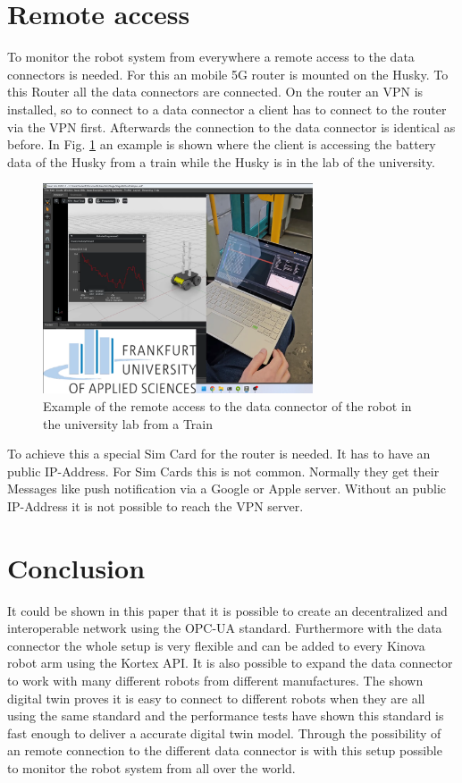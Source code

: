 \documentclass[conference]{IEEEtran}
\begin{document}
\section{Remote access}
To monitor the robot system from everywhere a remote access to the data connectors is needed.
For this an mobile 5G router is mounted on the Husky. To this Router all the data connectors are connected.
On the router an VPN is installed, so to connect to a data connector a client has to connect to the router via the VPN first.
Afterwards the connection to the data connector is identical as before.
In Fig. \ref{fig:RemoteAccess} an example is shown where the client is accessing the battery data of the Husky from a train while the Husky is in the lab of the university.
\begin{figure}[htbp]
    \centerline{\includegraphics[width=8cm]{Pictures/ZugZugriff.png}}
    \caption{Example of the remote access to the data connector of the robot in the university lab from a Train}
    \label{fig:RemoteAccess}
\end{figure}
To achieve this a special Sim Card for the router is needed.
It has to have an public IP-Address. For Sim Cards this is not common.
Normally they get their Messages like push notification via a Google or Apple server.
Without an public IP-Address it is not possible to reach the VPN server.
\section{Conclusion}
It could be shown in this paper that it is possible to create an decentralized and interoperable network using the OPC-UA standard.
Furthermore with the data connector the whole setup is very flexible and can be added to every Kinova robot arm using the Kortex API.
It is also possible to expand the data connector to work with many different robots from different manufactures.
The shown digital twin proves it is easy to connect to different robots when they are all using the same standard and the performance tests have shown this standard is fast enough to deliver a accurate digital twin model.
Through the possibility of an remote connection to the different data connector is with this setup possible to monitor the robot system from all over the world.
\end{document}
